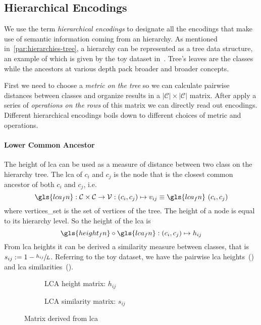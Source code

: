 \subsection{Hierarchical Encodings}
\label{subsec:hierarchical-encodings}

We use the term \emph{hierarchical encodings} to designate all the encodings
that make use of semantic information coming from an hierarchy. As mentioned
in~\cref{par:hierarchies-tree}, a hierarchy can be represented as a tree data
structure, an example of which is given by the toy dataset
in~. Tree's leaves are the classes while the ancestors
at various depth pack broader and broader concepts.

First we need to choose a \emph{metric on the tree} so we can calculate
pairwise distances between classes and organize results in a $|\mathcal{C}|
\times |\mathcal{C}|$ matrix. After apply a series of \emph{operations on the
rows} of this matrix we can directly read out encodings. Different hierarchical
encodings boils down to different choices of metric and operations.

\paragraph{Lower Common Ancestor}
The height of \acrfull{lca} can be used as a measure of distance between two
class on the hierarchy tree. The \acrshort{lca} of $c_i$ and $c_j$ is the node
that is the closest common ancestor of both $c_i$ and $c_j$, i.e.\
\begin{equation}
  \gls{lca_fn} : \mathcal{C} \times \mathcal{C} \to \mathcal{V}:
  \left(c_i, c_j\right) \mapsto v_{ij} \equiv
  \gls{lca_fn} \, \left(c_i, c_j\right)
  \label{eq:lca}
\end{equation}
where \gls{vertices_set} is the set of vertices of the tree. The height of a
node is equal to its hierarchy level. So the height of the \acrshort{lca} is
\begin{equation}
  \gls{height_fn} \circ \gls{lca_fn} : \left(c_i, c_j\right) \mapsto h_{ij}
  \label{eq:lca-height}
\end{equation}
From \acrshort{lca} heights it can be derived a similarity measure between
classes, that is $s_{ij} := 1 - \sfrac{h_{ij}}{L}$. Referring to the toy
dataset, we have the pairwise lca heights~() and
lca similarities~(\Cref{fig:03/lca-similarity-matrix}).
\begin{figure}[htbp]
  \begin{subfigure}{0.45\textwidth}
    \caption{LCA height matrix: $h_{ij}$}
    \label{fig:03/lca-height-matrix}
  \end{subfigure}
  \begin{subfigure}{0.45\textwidth}
    \caption{LCA similarity matrix: $s_{ij}$}
    \label{fig:03/lca-similarity-matrix}
  \end{subfigure}
  \caption{Matrix derived from \acrlong{lca}}
\end{figure}


